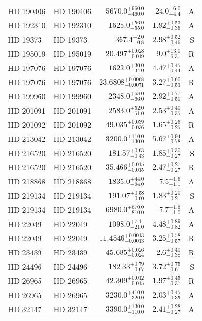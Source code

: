\begin{longtable*}{llrrr}
HD 190406 & HD 190406 & $5670.0^{+960.0}_{-460.0}$ & $24.0^{+6.0}_{-4.4}$ & A \\
HD 192310 & HD 192310 & $1625.0^{+56.0}_{-55.0}$ & $1.92^{+0.53}_{-0.36}$ & A \\
HD 19373 & HD 19373 & $367.4^{+2.0}_{-0.8}$ & $2.98^{+0.52}_{-0.46}$ & S \\
HD 195019 & HD 195019 & $20.497^{+0.028}_{-0.019}$ & $9.0^{+13.0}_{-6.3}$ & R \\
HD 197076 & HD 197076 & $1622.0^{+30.0}_{-34.0}$ & $4.47^{+0.45}_{-0.44}$ & A \\
HD 197076 & HD 197076 & $23.6808^{+0.0068}_{-0.0071}$ & $3.27^{+0.60}_{-0.53}$ & R \\
HD 199960 & HD 199960 & $2348.0^{+68.0}_{-66.0}$ & $2.92^{+0.77}_{-0.50}$ & A \\
HD 201091 & HD 201091 & $2583.0^{+52.0}_{-51.0}$ & $2.53^{+0.40}_{-0.35}$ & A \\
HD 201092 & HD 201092 & $49.035^{+0.039}_{-0.036}$ & $1.65^{+0.26}_{-0.25}$ & R \\
HD 213042 & HD 213042 & $3200.0^{+110.0}_{-130.0}$ & $5.67^{+0.94}_{-0.78}$ & A \\
HD 216520 & HD 216520 & $181.57^{+0.63}_{-0.43}$ & $1.85^{+0.30}_{-0.27}$ & S \\
HD 216520 & HD 216520 & $35.466^{+0.015}_{-0.015}$ & $2.47^{+0.27}_{-0.27}$ & R \\
HD 218868 & HD 218868 & $1835.0^{+44.0}_{-54.0}$ & $7.5^{+1.6}_{-1.1}$ & A \\
HD 219134 & HD 219134 & $191.07^{+0.58}_{-0.60}$ & $1.83^{+0.20}_{-0.21}$ & S \\
HD 219134 & HD 219134 & $6980.0^{+670.0}_{-810.0}$ & $7.7^{+1.6}_{-1.0}$ & A \\
HD 22049 & HD 22049 & $1098.0^{+7.1}_{-21.0}$ & $4.48^{+0.89}_{-0.82}$ & A \\
HD 22049 & HD 22049 & $11.4546^{+0.0013}_{-0.0013}$ & $3.25^{+0.58}_{-0.57}$ & R \\
HD 23439 & HD 23439 & $45.685^{+0.026}_{-0.024}$ & $2.6^{+0.40}_{-0.38}$ & R \\
HD 24496 & HD 24496 & $182.33^{+0.79}_{-0.67}$ & $3.72^{+0.75}_{-0.61}$ & S \\
HD 26965 & HD 26965 & $42.309^{+0.012}_{-0.015}$ & $1.97^{+0.45}_{-0.37}$ & R \\
HD 26965 & HD 26965 & $3230.0^{+410.0}_{-320.0}$ & $2.03^{+0.45}_{-0.35}$ & A \\
HD 32147 & HD 32147 & $3390.0^{+130.0}_{-110.0}$ & $2.41^{+0.28}_{-0.27}$ & A \\

\end{longtable*}
